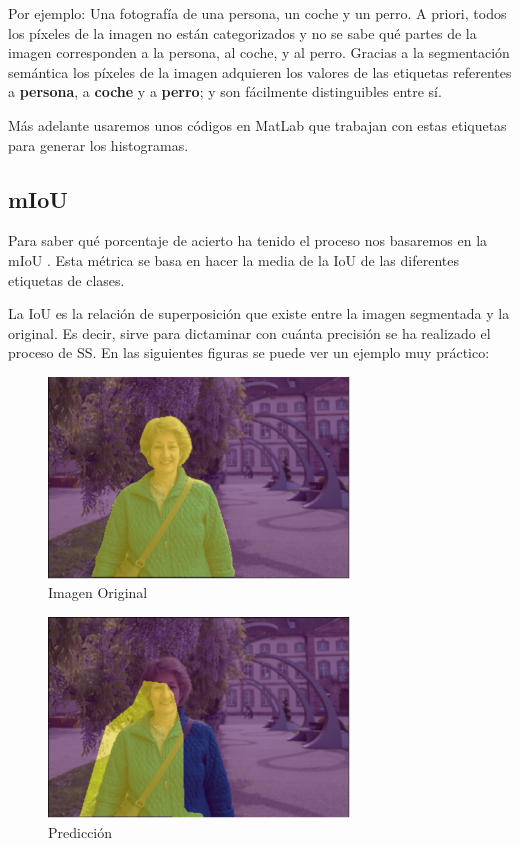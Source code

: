 Por ejemplo: Una fotografía de una persona, un coche y un perro. A priori, todos los píxeles de la imagen no están categorizados y no se sabe qué partes de la imagen corresponden a la persona, al coche, y al perro. Gracias a la segmentación semántica los píxeles de la imagen adquieren los valores de las etiquetas referentes a \textbf{persona}, a \textbf{coche} y a \textbf{perro}; y son fácilmente distinguibles entre sí.

Más adelante usaremos unos códigos en MatLab que trabajan con estas etiquetas para generar los histogramas.

\subsection{mIoU}

Para saber qué porcentaje de acierto ha tenido el proceso nos basaremos en la \ac{mIoU} \cite{miou-iou}. Esta métrica se basa en hacer la media de la \ac{IoU} de las diferentes etiquetas de clases.

La \ac{IoU} \cite{miou-iou} es la relación de superposición que existe entre la imagen segmentada y la original. Es decir, sirve para dictaminar con cuánta precisión se ha realizado el proceso de \ac{SS}. En las siguientes figuras se puede ver un ejemplo muy práctico:

\begin{figure}[H]
  \centering
  \includegraphics[width=8cm]{Figuras/Iou_1.eps}
  \caption{Imagen Original}
\end{figure}

\begin{figure}[H]
  \centering
  \includegraphics[width=8cm]{Figuras/IoU_2.eps}
  \caption{Predicción}
\end{figure}


